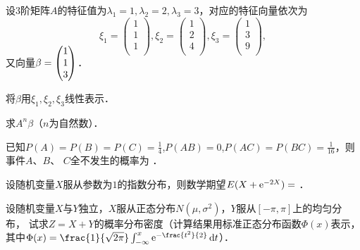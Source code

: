 \documentclass[plain,noanswer,medmath]{../../template/jnuexam}
\begin{document}

\begin{problem}
设$3$阶矩阵$A$的特征值为$\lambda_1 = 1,\lambda_2 = 2,\lambda_3 = 3$，对应的特征向量依次为
$$\xi_1 = \begin{pmatrix}
 1 \\
 1 \\
 1 \\
\end{pmatrix},\xi_2 = \begin{pmatrix}
 1 \\
 2 \\
 4 \\
\end{pmatrix},\xi_3 = \begin{pmatrix}
 1 \\
 3 \\
 9 \\
\end{pmatrix},$$
又向量$\beta = \smash[t]{\begin{pmatrix}
 1 \\
 1 \\
 3 \\
\end{pmatrix}}$．
\begin{enumerate*}
\item 将$\beta$用$\xi_1,\xi_2,\xi_3$线性表示．
\item 求$A^n\beta$（$n$为自然数）．
\end{enumerate*}
\end{problem}




\begin{problem}
已知$P(A) = P(B) = P(C) = \frac{1}{4}$,$P(AB) = 0$,$P(AC) = P(BC) = \frac{1}{16}$，则事件$A$、$B$、
$C$全不发生的概率为 \fillin{}．
\end{problem}


\begin{problem}
设随机变量$X$服从参数为$1$的指数分布，则数学期望$E(X + \mathrm{e}^{-2X}) =$ \fillin{}．
\end{problem}



\begin{problem}
设随机变量$X$与$Y$独立，$X$服从正态分布$N(\mu ,\sigma^2)$，$Y$服从$[- \pi ,\pi]$上的均匀分布，
试求$Z = X + Y$的概率分布密度（计算结果用标准正态分布函数$\Phi(x)$表示，
其中$\Phi(x) = \frac{1}{\sqrt{2\pi}}\int_{-\infty}^x \e^{- \frac{t^2}{2}} \dt$）．
\end{problem}
\end{document}
